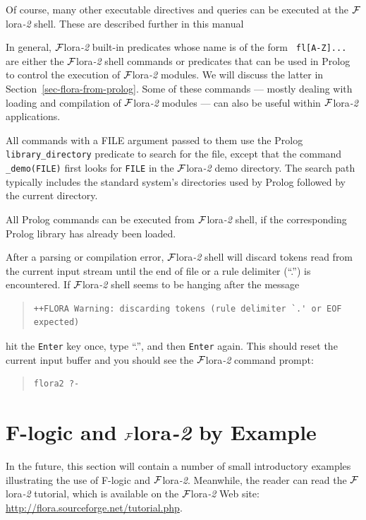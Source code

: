 \documentclass[11pt]{article}
\newcommand{\FLORA}{{\mbox{\sc ${\cal F}${lora}\rm\emph{-2}}}\xspace}
\newcommand{\fl}{\mbox{F-logic}\xspace}
\begin{document}
Of course, many other executable directives and queries can be executed at
the \FLORA shell. These are described further in this manual

In general, \FLORA built-in predicates whose name is of the form {\tt
  fl[A-Z]...} are either the \FLORA shell commands or predicates that can
be used in Prolog to control the execution of \FLORA modules. We will
discuss the latter in Section~\ref{sec-flora-from-prolog}. Some of these
commands --- mostly dealing with loading and compilation of \FLORA modules
  --- can also be useful within \FLORA applications.

All commands with a FILE argument passed to them use the Prolog
{\tt library\_directory} predicate to search for the file, except that the
command {\tt \_demo(FILE)} first looks for {\tt FILE} in the \FLORA demo
directory. The search path typically includes the standard system's
directories used by Prolog followed by the current directory. 

All Prolog commands can be executed from \FLORA shell, if the corresponding
Prolog library has already been loaded.

After a parsing or compilation error, \FLORA shell will
discard tokens read from the current input stream until the end of file or a
rule delimiter (``.'') is encountered. If \FLORA shell seems to be hanging
after the message
\begin{quote}
\begin{verbatim}
++FLORA Warning: discarding tokens (rule delimiter `.' or EOF expected)
\end{verbatim}
\end{quote}
hit the {\tt Enter} key once, type ``.'', and then {\tt Enter} again.  This
should reset the current input buffer and you should see the \FLORA command
prompt:
\begin{quote}
\begin{verbatim}
flora2 ?-
\end{verbatim}
\end{quote}

 
\section{\fl and \FLORA by Example}


In the future, this section will contain a number of small
introductory examples illustrating the use of \fl and \FLORA. Meanwhile, the
reader can read the \FLORA tutorial, which is
available on the \FLORA Web site: 
\url{http://flora.sourceforge.net/tutorial.php}. 
\end{document}
